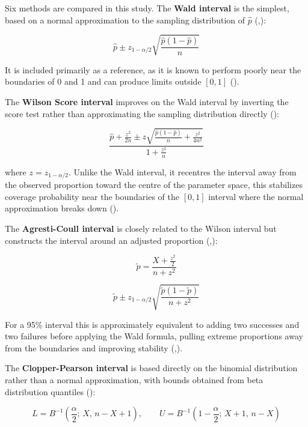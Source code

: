 \documentclass{article}
\begin{document}
Six methods are compared in this study. The \textbf{Wald interval} is
the simplest, based on a normal approximation to the sampling
distribution of \(\hat{p}\)
(,):

\[\hat{p} \pm z_{1-\alpha/2} \sqrt{\frac{\hat{p}(1-\hat{p})}{n}}\]

It is included primarily as a reference, as it is known to perform
poorly near the boundaries of 0 and 1 and can produce limits outside
\([0, 1]\) ().

The \textbf{Wilson Score interval} improves on the Wald interval by
inverting the score test rather than approximating the sampling
distribution directly ():

\[\frac{\hat{p} + \frac{z^2}{2n} \pm z\sqrt{\frac{\hat{p}(1-\hat{p})}{n} + \frac{z^2}{4n^2}}}{1 + \frac{z^2}{n}}\]

where \(z = z_{1-\alpha/2}\). Unlike the Wald interval, it recentres the
interval away from the observed proportion toward the centre of the
parameter space, this stabilizes coverage probability near the
boundaries of the \([0, 1]\) interval where the normal approximation
breaks down ().

The \textbf{Agresti-Coull interval} is closely related to the Wilson
interval but constructs the interval around an adjusted proportion
(,):

\[\tilde{p} = \frac{X + \frac{z^2}{2}}{n + z^2}\]

\[\tilde{p} \pm z_{1-\alpha/2} \sqrt{\frac{\tilde{p}(1-\tilde{p})}{n + z^2}}\]

For a 95\% interval this is approximately equivalent to adding two
successes and two failures before applying the Wald formula, pulling
extreme proportions away from the boundaries and improving stability
(,).

The \textbf{Clopper-Pearson interval} is based directly on the binomial
distribution rather than a normal approximation, with bounds obtained
from beta distribution quantiles ():

\[L = B^{-1}\!\left(\frac{\alpha}{2};\, X,\, n-X+1\right), \qquad U = B^{-1}\!\left(1-\frac{\alpha}{2};\, X+1,\, n-X\right)\]
\end{document}
